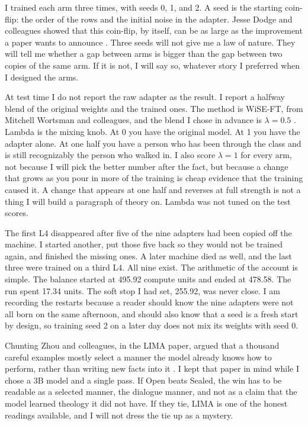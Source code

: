 \documentclass[11pt]{article}
\begin{document}
I trained each arm three times, with seeds 0, 1, and 2. A seed is the starting coin-flip: the order of the rows and the initial noise in the adapter. Jesse Dodge and colleagues showed that this coin-flip, by itself, can be as large as the improvement a paper wants to announce \citep{dodge2020}. Three seeds will not give me a law of nature. They will tell me whether a gap between arms is bigger than the gap between two copies of the same arm. If it is not, I will say so, whatever story I preferred when I designed the arms.

At test time I do not report the raw adapter as the result. I report a halfway blend of the original weights and the trained ones. The method is WiSE-FT, from Mitchell Wortsman and colleagues, and the blend I chose in advance is $\lambda = 0.5$ \citep{wortsman2022}. Lambda is the mixing knob. At 0 you have the original model. At 1 you have the adapter alone. At one half you have a person who has been through the class and is still recognizably the person who walked in. I also score $\lambda = 1$ for every arm, not because I will pick the better number after the fact, but because a change that grows as you pour in more of the training is cheap evidence that the training caused it. A change that appears at one half and reverses at full strength is not a thing I will build a paragraph of theory on. Lambda was not tuned on the test scores.

The first L4 disappeared after five of the nine adapters had been copied off the machine. I started another, put those five back so they would not be trained again, and finished the missing ones. A later machine died as well, and the last three were trained on a third L4. All nine exist. The arithmetic of the account is simple. The balance started at 495.92 compute units and ended at 478.58. The run spent 17.34 units. The soft stop I had set, 255.92, was never close. I am recording the restarts because a reader should know the nine adapters were not all born on the same afternoon, and should also know that a seed is a fresh start by design, so training seed 2 on a later day does not mix its weights with seed 0.

Chunting Zhou and colleagues, in the LIMA paper, argued that a thousand careful examples mostly select a manner the model already knows how to perform, rather than writing new facts into it \citep{zhou2023}. I kept that paper in mind while I chose a 3B model and a single pass. If Open beats Sealed, the win has to be readable as a selected manner, the dialogue manner, and not as a claim that the model learned theology it did not have. If they tie, LIMA is one of the honest readings available, and I will not dress the tie up as a mystery.
\end{document}
